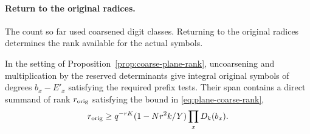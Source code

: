 \paragraph{Return to the original radices.}
\label{par:plane-rank-transfer}

The count so far used coarsened digit classes. Returning to the original radices determines the rank available for the actual symbols.

\begin{proposition}\label{prop:plane-original-symbol-rank}
In the setting of Proposition~\ref{prop:coarse-plane-rank},
uncoarsening and multiplication by the reserved determinants
give integral original symbols of degrees \(b_x-E'_x\)
satisfying the required prefix tests. Their span contains a direct summand of rank \(r_{\rm orig}\) satisfying the bound in \eqref{eq:plane-coarse-rank},
\[
 r_{\rm orig}\ge q^{-rK}(1-Nr^2k/Y)\prod_x D_k(b_x).
\]

\end{proposition}

